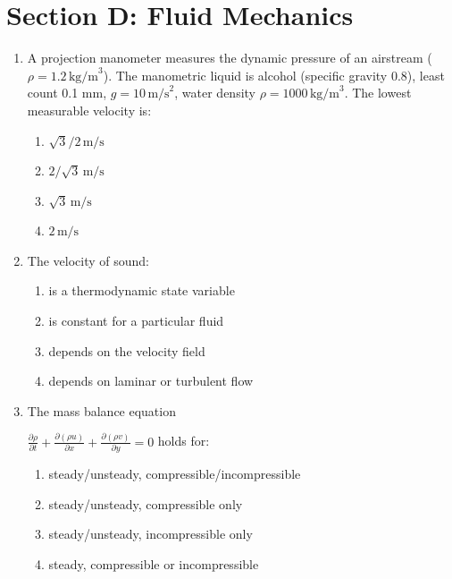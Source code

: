 \documentclass[journal,cmex10]{IEEEtran}
\theoremstyle{remark}
\numberwithin{equation}{enumi}
\numberwithin{figure}{enumi}
\begin{document}
\section*{Section D: Fluid Mechanics}
\vspace{2\baselineskip}
\begin{enumerate}[label=\arabic*)]
\item A projection manometer measures the dynamic pressure of an airstream ($\rho = 1.2\,\text{kg/m}^3$). The manometric liquid is alcohol (specific gravity 0.8), least count 0.1 mm, $g = 10\,\text{m/s}^2$, water density $\rho = 1000\,\text{kg/m}^3$. The lowest measurable velocity is:
\vspace{0.2cm}
\hfill {}


\begin{enumerate}[label=\alph*)]
    \item $\sqrt{3}/2\,\text{m/s}$
    \item $2/\sqrt{3}\,\text{m/s}$
    \item $\sqrt{3}\,\text{m/s}$
    \item $2\,\text{m/s}$
\end{enumerate}

\vspace{0.5cm}
\item The velocity of sound:  
\hfill{}

\begin{enumerate}[label=\alph*)]
    \item is a thermodynamic state variable
    \item is constant for a particular fluid
    \item depends on the velocity field
    \item depends on laminar or turbulent flow
\end{enumerate}

\vspace{0.5cm}
\item The mass balance equation 

$\frac{\partial \rho}{\partial t} + \frac{\partial (\rho u)}{\partial x} + \frac{\partial (\rho v)}{\partial y} = 0
$
holds for:  
\hfill {}
\begin{enumerate}[label=\alph*)]
    \item steady/unsteady, compressible/incompressible
    \item steady/unsteady, compressible only
    \item steady/unsteady, incompressible only
    \item steady, compressible or incompressible
\end{enumerate}


\end{enumerate}
\end{document}
